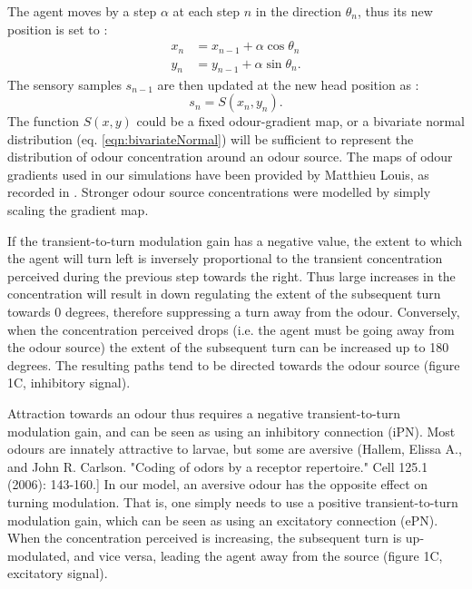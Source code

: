 \documentclass[10pt,a4paper]{article}
\begin{document}
The agent moves by a step $\alpha$ at each step $n$ in the direction $\theta_n$, thus its new position is set to :
\begin{align}
x_n &= x_{n-1}+ \alpha \cos \theta_{n} \\
y_n &= y_{n-1}+ \alpha  \sin \theta_{n}.
\end{align}
The sensory samples $s_{n-1}$ are then updated at the new head position as :
\begin{equation}
s_n = S(x_n,y_n).
\end{equation}
The function $S(x,y)$ could be a  fixed odour-gradient map, or a bivariate normal distribution (eq. \eqref{eqn:bivariateNormal}) will be sufficient to represent the distribution of odour concentration around an odour source. 
 The maps of odour gradients used in our simulations have been provided by Matthieu Louis, as recorded in \citep{gomez2014multilevel}. Stronger odour source concentrations were modelled by simply scaling the gradient map. 


If the transient-to-turn modulation gain has a negative value, the extent to which the agent will turn left is inversely proportional to the transient concentration perceived during the previous step towards the right. Thus large increases in the concentration will result in down regulating the extent of the subsequent turn towards 0 degrees, therefore suppressing a turn away from the odour. Conversely, when the concentration perceived drops (i.e. the agent must be going away from the odour source) the extent of the subsequent turn can be increased up to 180 degrees. The resulting paths tend to be directed towards the odour source (figure 1C, inhibitory signal). 

Attraction towards an odour thus requires a negative transient-to-turn modulation gain, and can be seen as using an inhibitory connection (iPN).  Most odours are innately attractive to larvae, but some are aversive (Hallem, Elissa A., and John R. Carlson. "Coding of odors by a receptor repertoire." Cell 125.1 (2006): 143-160.] In our model, an aversive odour has the opposite effect on turning modulation. That is, one simply needs to use a positive transient-to-turn modulation gain, which can be seen as using an excitatory connection (ePN). When the concentration perceived is increasing, the subsequent turn is up-modulated, and vice versa, leading the agent away from the source (figure 1C, excitatory signal).
\end{document}
